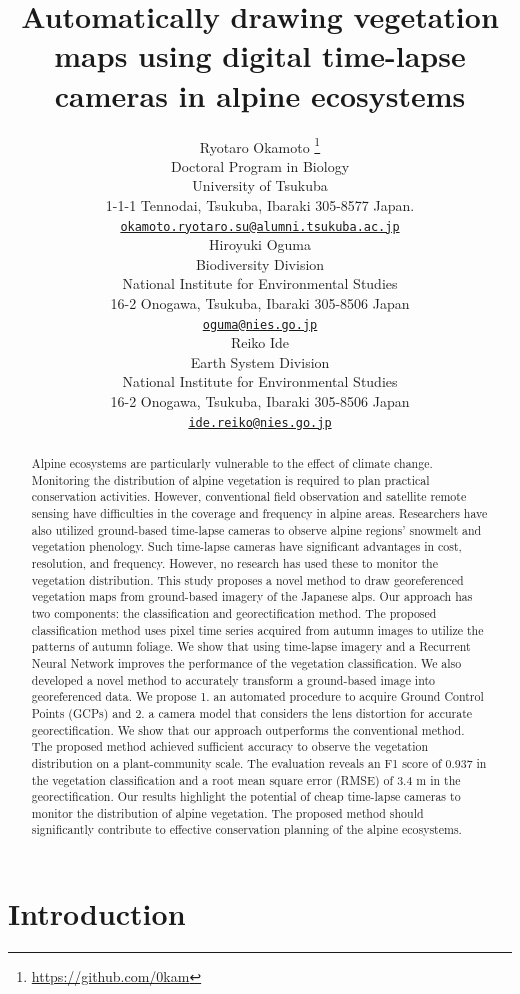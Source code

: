 \documentclass{article}
\title{Automatically drawing vegetation maps using digital time-lapse cameras in alpine ecosystems}
\author{
    Ryotaro Okamoto
    \thanks{\url{https://github.com/0kam}}
   \\
    Doctoral Program in Biology \\
    University of Tsukuba \\
  1-1-1 Tennodai, Tsukuba, Ibaraki 305-8577 Japan. \\
  \texttt{\href{mailto:okamoto.ryotaro.su@alumni.tsukuba.ac.jp}{\nolinkurl{okamoto.ryotaro.su@alumni.tsukuba.ac.jp}}} \\
   \And
    Hiroyuki Oguma
   \\
    Biodiversity Division \\
    National Institute for Environmental Studies \\
  16-2 Onogawa, Tsukuba, Ibaraki 305-8506 Japan \\
  \texttt{\href{mailto:oguma@nies.go.jp}{\nolinkurl{oguma@nies.go.jp}}} \\
   \And
    Reiko Ide
   \\
    Earth System Division \\
    National Institute for Environmental Studies \\
  16-2 Onogawa, Tsukuba, Ibaraki 305-8506 Japan \\
  \texttt{\href{mailto:ide.reiko@nies.go.jp}{\nolinkurl{ide.reiko@nies.go.jp}}} \\
  }
\begin{document}
\maketitle


\begin{abstract}
Alpine ecosystems are particularly vulnerable to the effect of climate change. Monitoring the distribution of alpine vegetation is required to plan practical conservation activities. However, conventional field observation and satellite remote sensing have difficulties in the coverage and frequency in alpine areas. Researchers have also utilized ground-based time-lapse cameras to observe alpine regions' snowmelt and vegetation phenology. Such time-lapse cameras have significant advantages in cost, resolution, and frequency. However, no research has used these to monitor the vegetation distribution. This study proposes a novel method to draw georeferenced vegetation maps from ground-based imagery of the Japanese alps. Our approach has two components: the classification and georectification method. The proposed classification method uses pixel time series acquired from autumn images to utilize the patterns of autumn foliage. We show that using time-lapse imagery and a Recurrent Neural Network improves the performance of the vegetation classification. We also developed a novel method to accurately transform a ground-based image into georeferenced data. We propose 1. an automated procedure to acquire Ground Control Points (GCPs) and 2. a camera model that considers the lens distortion for accurate georectification. We show that our approach outperforms the conventional method. The proposed method achieved sufficient accuracy to observe the vegetation distribution on a plant-community scale. The evaluation reveals an F1 score of 0.937 in the vegetation classification and a root mean square error (RMSE) of 3.4 m in the georectification. Our results highlight the potential of cheap time-lapse cameras to monitor the distribution of alpine vegetation. The proposed method should significantly contribute to effective conservation planning of the alpine ecosystems.
\end{abstract}


\hypertarget{introduction}{%
\section{Introduction}\label{introduction}}
\end{document}
